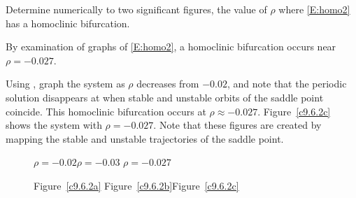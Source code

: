 \documentclass{ximera}
\begin{document}
\begin{computerExercise} \label{c9.6.2c}
Determine numerically to two significant figures, the value of $\rho$
where \eqref{E:homo2} has a homoclinic bifurcation. 

\begin{solution}

\ans By examination of {\pplane} graphs of \eqref{E:homo2}, a homoclinic
bifurcation occurs near $\rho = -0.027$.

\soln 
Using {\pplane}, graph the system as $\rho$ decreases from $-0.02$, and
note that the periodic solution disappears at when stable and unstable
orbits of the saddle point coincide.  This homoclinic bifurcation occurs
at $\rho \approx -0.027$.  Figure~\ref{c9.6.2c} shows the system with
$\rho = -0.027$.  Note that these figures are created by mapping the stable
and unstable trajectories of the saddle point.

\begin{figure}[htb]
                       \centerline{%
                       }
		\centerline{$\rho = -0.02$\hspace{1.1in}$\rho = -0.03$
\hspace{1.1in}$\rho = -0.027$}
		\centerline{Figure~\ref{c9.6.2a}\hspace{1.2in}
Figure~\ref{c9.6.2b}\hspace{1.2in}Figure~\ref{c9.6.2c}}
\end{figure}

\end{solution}
\end{computerExercise} 
\end{document}
